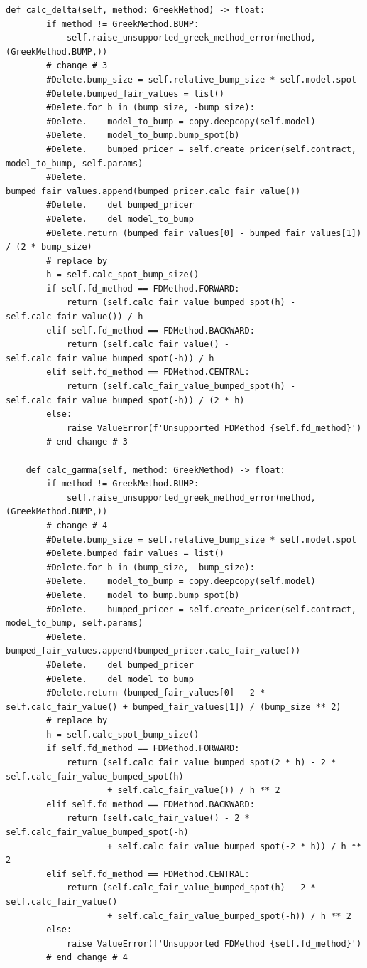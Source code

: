 \documentclass[11pt,a4paper]{article}
\begin{document}
\begin{lstlisting}[style=pysmall]
    def calc_delta(self, method: GreekMethod) -> float:
        if method != GreekMethod.BUMP:
            self.raise_unsupported_greek_method_error(method, (GreekMethod.BUMP,))
        # change # 3
        #Delete.bump_size = self.relative_bump_size * self.model.spot
        #Delete.bumped_fair_values = list()
        #Delete.for b in (bump_size, -bump_size):
        #Delete.    model_to_bump = copy.deepcopy(self.model)
        #Delete.    model_to_bump.bump_spot(b)
        #Delete.    bumped_pricer = self.create_pricer(self.contract, model_to_bump, self.params)
        #Delete.    bumped_fair_values.append(bumped_pricer.calc_fair_value())
        #Delete.    del bumped_pricer
        #Delete.    del model_to_bump
        #Delete.return (bumped_fair_values[0] - bumped_fair_values[1]) / (2 * bump_size)
        # replace by
        h = self.calc_spot_bump_size()
        if self.fd_method == FDMethod.FORWARD:
            return (self.calc_fair_value_bumped_spot(h) - self.calc_fair_value()) / h
        elif self.fd_method == FDMethod.BACKWARD:
            return (self.calc_fair_value() - self.calc_fair_value_bumped_spot(-h)) / h
        elif self.fd_method == FDMethod.CENTRAL:
            return (self.calc_fair_value_bumped_spot(h) - self.calc_fair_value_bumped_spot(-h)) / (2 * h)
        else:
            raise ValueError(f'Unsupported FDMethod {self.fd_method}')
        # end change # 3

    def calc_gamma(self, method: GreekMethod) -> float:
        if method != GreekMethod.BUMP:
            self.raise_unsupported_greek_method_error(method, (GreekMethod.BUMP,))
        # change # 4
        #Delete.bump_size = self.relative_bump_size * self.model.spot
        #Delete.bumped_fair_values = list()
        #Delete.for b in (bump_size, -bump_size):
        #Delete.    model_to_bump = copy.deepcopy(self.model)
        #Delete.    model_to_bump.bump_spot(b)
        #Delete.    bumped_pricer = self.create_pricer(self.contract, model_to_bump, self.params)
        #Delete.    bumped_fair_values.append(bumped_pricer.calc_fair_value())
        #Delete.    del bumped_pricer
        #Delete.    del model_to_bump
        #Delete.return (bumped_fair_values[0] - 2 * self.calc_fair_value() + bumped_fair_values[1]) / (bump_size ** 2)
        # replace by
        h = self.calc_spot_bump_size()
        if self.fd_method == FDMethod.FORWARD:
            return (self.calc_fair_value_bumped_spot(2 * h) - 2 * self.calc_fair_value_bumped_spot(h)
                    + self.calc_fair_value()) / h ** 2
        elif self.fd_method == FDMethod.BACKWARD:
            return (self.calc_fair_value() - 2 * self.calc_fair_value_bumped_spot(-h)
                    + self.calc_fair_value_bumped_spot(-2 * h)) / h ** 2
        elif self.fd_method == FDMethod.CENTRAL:
            return (self.calc_fair_value_bumped_spot(h) - 2 * self.calc_fair_value()
                    + self.calc_fair_value_bumped_spot(-h)) / h ** 2
        else:
            raise ValueError(f'Unsupported FDMethod {self.fd_method}')
        # end change # 4
\end{lstlisting}
\end{document}
